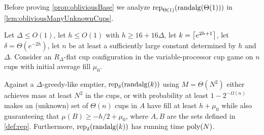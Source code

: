 Before proving \cref{prop:obliviousBase} we analyze
$\operatorname{\text{\textup{rep}}}_{\Theta(1)}(\operatorname{\text{\textup{randalg}}}(\Theta(1)))$ in \cref{lem:obliviousManyUnknownCups}.
\begin{lemma}
  \label{lem:obliviousManyUnknownCups} Let $\Delta \le O(1)$, let
  $h \le O(1)$ with $h \ge 16+16\Delta$, let $k =
  \left\lceil e^{2h+1} \right\rceil$, let $\delta = \Theta(e^{-2h})$, let $n$ be at
  least a sufficiently large constant determined by $h$ and
  $\Delta$. Consider an $R_\Delta$-flat cup configuration in the
  variable-processor cup game on $n$ cups with initial average
  fill $\mu_0$.

  Against a $\Delta$-greedy-like emptier,
  $\operatorname{\text{\textup{rep}}}_{\delta}(\operatorname{\text{\textup{randalg}}}(k))$ using $M=\Theta(N^2)$ either
  achieves mass at least $N^2$ in the cups, or with probability
  at least $1-2^{-\Omega(n)}$ makes an (unknown) set of
  $\Theta(n)$ cups in $A$ have fill at least $h + \mu_0$ while
  also guaranteeing that $\mu(B) \ge -h/2 + \mu_0$, where $A,B$
  are the sets defined in \cref{def:rep}. Furthermore,
  $\operatorname{\text{\textup{rep}}}_{\delta}(\operatorname{\text{\textup{randalg}}}(k))$ has running time $\operatorname{\text{poly}}(N)$.
\end{lemma}
